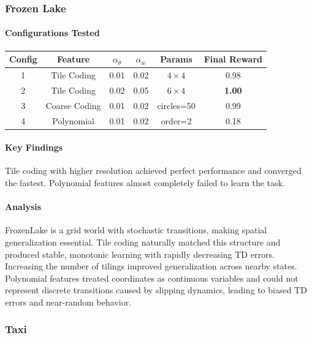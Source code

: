 \documentclass{article}
\begin{document}
\subsubsection{Frozen Lake}

\paragraph{Configurations Tested}
\begin{center}
\begin{tabular}{c c c c c c}
\hline
Config & Feature & $\alpha_\theta$ & $\alpha_w$ & Params & Final Reward \\
\hline
1 & Tile Coding & 0.01 & 0.02 & $4\times4$ & 0.98 \\
2 & Tile Coding & 0.02 & 0.05 & $6\times4$ & \textbf{1.00} \\
3 & Coarse Coding & 0.01 & 0.02 & circles=50 & 0.99 \\
4 & Polynomial & 0.01 & 0.02 & order=2 & 0.18 \\
\hline
\end{tabular}
\end{center}

\paragraph{Key Findings}
Tile coding with higher resolution achieved perfect performance and converged the fastest. Polynomial features almost completely failed to learn the task.

\paragraph{Analysis}
FrozenLake is a grid world with stochastic transitions, making spatial generalization essential. Tile coding naturally matched this structure and produced stable, monotonic learning with rapidly decreasing TD errors. Increasing the number of tilings improved generalization across nearby states.  
Polynomial features treated coordinates as continuous variables and could not represent discrete transitions caused by slipping dynamics, leading to biased TD errors and near-random behavior.

\subsubsection{Taxi}
\end{document}

